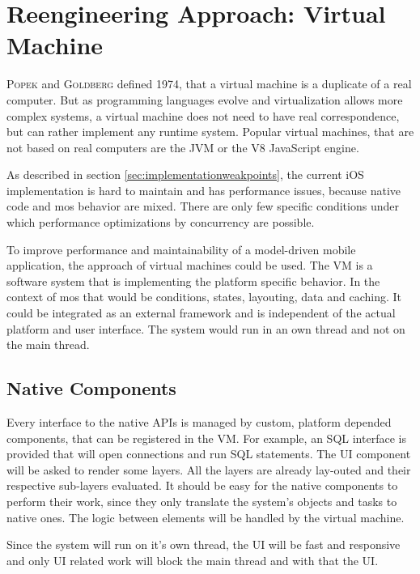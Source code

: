 \section{Reengineering Approach: Virtual Machine}
\label{sec:virtualmachineapproach}

\textsc{Popek} and \textsc{Goldberg} \cite{popek_formal_1974} defined 1974, that a virtual machine is a duplicate of a real computer.
But as programming languages evolve and virtualization allows more complex systems, a virtual machine does not need to have real correspondence, but can rather implement any runtime system.
Popular virtual machines, that are not based on real computers are the \ac{JVM} or the V8 JavaScript engine.

As described in section \ref{sec:implementationweakpoints}, the current iOS implementation is hard to maintain and has performance issues, because native code and mos behavior are mixed.
There are only few specific conditions under which performance optimizations by concurrency are possible.

To improve performance and maintainability of a model-driven mobile application, the approach of virtual machines could be used.
The \ac{VM} is a software system that is implementing the platform specific behavior.
In the context of \ac{mos} that would be conditions, states, layouting, data and caching.
It could be integrated as an external framework and is independent of the actual platform and user interface.
The system would run in an own thread and not on the main thread.

\subsection{Native Components}

Every interface to the native \acp{API} is managed by custom, platform depended components, that can be registered in the \ac{VM}.
For example, an \ac{SQL} interface is provided that will open connections and run \ac{SQL} statements.
The \ac{UI} component will be asked to render some layers.
All the layers are already lay-outed and their respective sub-layers evaluated.
It should be easy for the native components to perform their work, since they only translate the system's objects and tasks to native ones.
The logic between elements will be handled by the virtual machine.

Since the system will run on it's own thread, the \ac{UI} will be fast and responsive and only \ac{UI} related work will block the main thread and with that the \ac{UI}.


